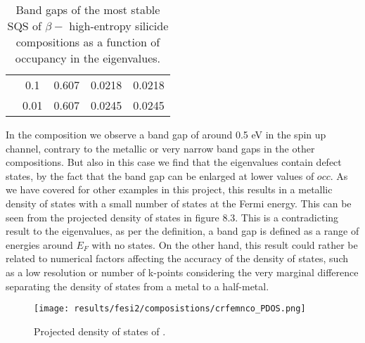 \begin{table}[H]
\begin{tabular}{@{}ccccc@{}}
\multicolumn{1}{c|}{}                             & \multicolumn{1}{c|}{0.1}  & 0.607                                                                         & 0.0218                                                                        & 0.0218                                                                         \\
\multicolumn{1}{c|}{}                             & \multicolumn{1}{c|}{0.01}                      & 0.607                                                                         & 0.0245                                                                        & 0.0245                                                                         \\ \bottomrule
\end{tabular}
\caption{Band gaps of the most stable SQS of $\beta-$  high-entropy silicide compositions as a function of occupancy in the eigenvalues.}
\end{table}

In the  composition we observe a band gap of around 0.5 eV in the spin up channel, contrary to the metallic or very narrow band gaps in the other compositions. But also in this case we find that the eigenvalues contain defect states, by the fact that the band gap can be enlarged at lower values of $occ$. As we have covered for other examples in this project, this results in a metallic density of states with a small number of states at the Fermi energy. This can be seen from the projected density of states in figure 8.3. This is a contradicting result to the eigenvalues, as per the definition, a band gap is defined as a range of energies around $E_F$ with no states. On the other hand, this result could rather be related to numerical factors affecting the accuracy of the density of states, such as a low resolution or number of k-points considering the very marginal difference separating the density of states from a metal to a half-metal.
  
\begin{figure}[H]
\centering
\texttt{[image: results/fesi2/composistions/crfemnco\_PDOS.png]}
\caption{Projected density of states of .}
\end{figure}

